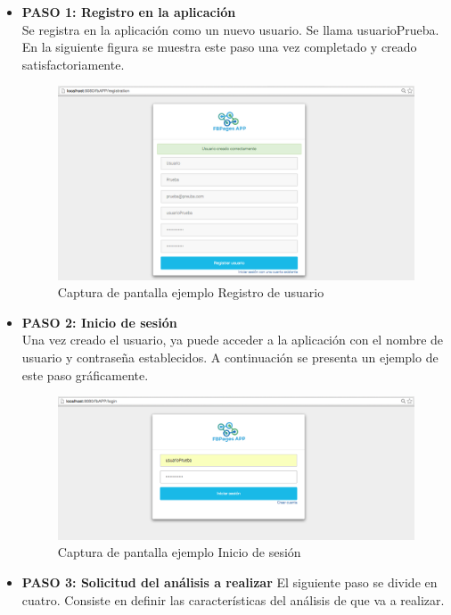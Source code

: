 \begin{itemize}
\item \textbf{PASO 1: Registro en la aplicación}\\
Se registra en la aplicación como un nuevo usuario. Se llama usuarioPrueba. En la siguiente figura se muestra este paso una vez completado y creado satisfactoriamente.
\begin{figure}[H]
\centering
\includegraphics[width=5.5in]{figuras/ejemploRegistro.png}
\caption{Captura de pantalla ejemplo Registro de usuario} \label{fig:exregistro}
\end{figure}
\item \textbf{PASO 2: Inicio de sesión}\\
Una vez creado el usuario, ya puede acceder a la aplicación con el nombre de usuario y contraseña establecidos. A continuación se presenta un ejemplo de este paso gráficamente. 
\begin{figure}[H]
\centering
\includegraphics[width=5in]{figuras/ejemploLogin.png}
\caption{Captura de pantalla ejemplo Inicio de sesión} \label{fig:exlogin}
\end{figure}
\item \textbf{PASO 3: Solicitud del análisis a realizar}
El siguiente paso se divide en cuatro. Consiste en definir las características del análisis de que va a realizar.
\begin{enumerate}

\end{enumerate}
\end{itemize}
